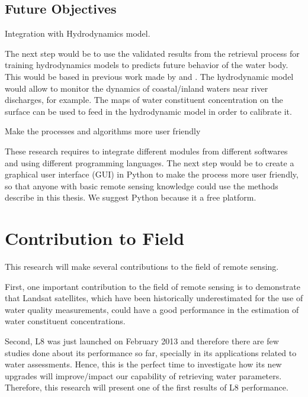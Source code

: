\subsection{Future Objectives}
	\begin{enumerate}
			{\bf \item Integration with Hydrodynamics model.  } 

The next step would be to use the validated results from the retrieval process for training hydrodynamics models to predicts future behavior of the water body. This would be based in previous work made by \cite{Pahlevan:2012} and \cite{GeraceThesis}. The hydrodynamic model would allow to monitor the dynamics of coastal/inland waters near river discharges, for example. The maps of water constituent concentration on the surface can be used to feed in the hydrodynamic model in order to calibrate it. 

			{\bf \item Make the processes and algorithms more user friendly} 

These research requires to integrate different modules from different softwares and using different programming languages. The next step would be to create a graphical user interface (GUI) in Python to make the process more user friendly, so that anyone with basic remote sensing knowledge could use the methods describe in this thesis. We suggest Python because it a free platform.

	\end{enumerate}	

		

\section{Contribution to Field}
\label{sec:contributiontofield}
This research will make several contributions to the field of remote sensing.

First, one important contribution to the field of remote sensing is to demonstrate that Landsat satellites, which have been historically underestimated for the use of water quality measurements, could have a good performance in the estimation of water constituent concentrations.

Second, L8 was just launched on February 2013 and therefore there are few studies done about its performance so far, specially in its applications related to water assessments. Hence, this is the perfect time to investigate how its new upgrades will improve/impact our capability of retrieving water parameters. Therefore, this research will present one of the first results of L8 performance.  

